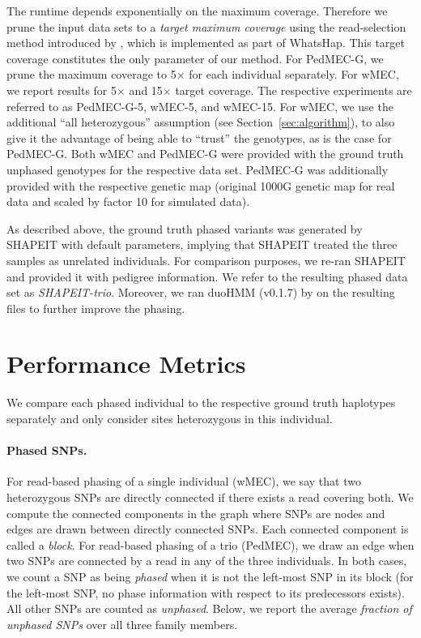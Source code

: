 The runtime depends exponentially on the maximum coverage.
Therefore we prune the input data sets to a \emph{target maximum coverage} using the read-selection method introduced by \cite{Fischer2016}, which is implemented as part of WhatsHap.
This target coverage constitutes the only parameter of our method.
For PedMEC-G, we prune the maximum coverage to 5$\times$ for each individual separately.
For wMEC, we report results for 5$\times$ and 15$\times$ target coverage.
The respective experiments are referred to as \mbox{PedMEC-G-5}, wMEC-5, and wMEC-15.
For wMEC, we use the additional ``all heterozygous'' assumption (see Section~\ref{sec:algorithm}), to also give it the advantage of being able to ``trust'' the genotypes, as is the case for PedMEC-G.
Both wMEC and PedMEC-G were provided with the ground truth unphased genotypes for the respective data set.
PedMEC-G was additionally provided with the respective genetic map (original 1000G genetic map for real data and scaled by factor 10 for simulated data).


As described above, the ground truth phased variants was generated by SHAPEIT with default parameters, implying that SHAPEIT treated the three samples as unrelated individuals.
For comparison purposes, we re-ran SHAPEIT and provided it with pedigree information.
We refer to the resulting phased data set as \emph{SHAPEIT-trio}.
Moreover, we ran duoHMM (v0.1.7) by \cite{OConnell2014} on the resulting files to further improve the phasing.

\section{Performance Metrics}\label{sec:metrics}
We compare each phased individual to the respective ground truth haplotypes separately and only consider sites heterozygous in this individual.

\paragraph{Phased SNPs.}
For read-based phasing of a single individual (wMEC), we say that two heterozygous SNPs are directly connected if there exists a read covering both.
We compute the connected components in the graph where SNPs are nodes and edges are drawn between directly connected SNPs.
Each connected component is called a \emph{block}.
For read-based phasing of a trio (PedMEC), we draw an edge when two SNPs are connected by a read in any of the three individuals.
In both cases, we count a SNP as being \emph{phased} when it is not the left-most SNP in its block (for the left-most SNP, no phase information with respect to its predecessors exists).
All other SNPs are counted as \emph{unphased}.
Below, we report the average \emph{fraction of unphased SNPs} over all three family members.

